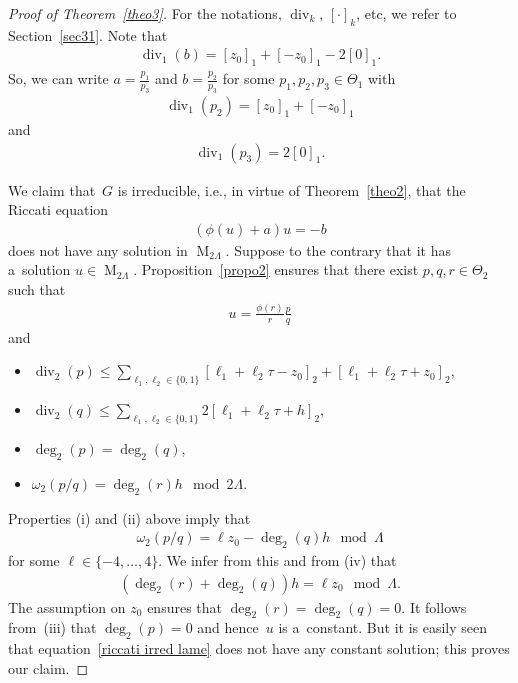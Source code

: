 \documentclass[10pt,a4paper]{amsart}
\numberwithin{equation}{section}
\newcommand{\divi}[1]{\operatorname{div}_{#1}}
\newcommand{\weight}[1]{\omega_{#1}}
\newcommand{\degr}[1]{\deg_{#1}}
\newcommand{\prodtheta}[1]{\Theta_{#1}}
\begin{document}
\begin{proof}[Proof of Theorem~\ref{theo3}] For the notations, $\divi{k}$, $[\cdot]_k$, etc, we refer to Section~\ref{sec31}.
Note that
\begin{gather*}
\divi{1} (b)=[z_{0}]_{1}+[-z_{0}]_{1}-2[0]_{1}.
\end{gather*}
So, we can write $a=\frac{p_{1}}{p_{3}}$ and $b=\frac{p_{2}}{p_{3}}$ for some $p_{1},p_{2},p_{3}\in \prodtheta{1}$ with
\begin{gather*}
\divi{1} (p_{2})=[z_{0}]_{1}+[-z_{0}]_{1}
\end{gather*}
and
\begin{gather*}
\divi{1} (p_{3})=2[0]_{1}.
\end{gather*}

We claim that~$G$ is irreducible, i.e., in virtue of Theorem~\ref{theo2}, that the Riccati equation
\begin{gather}
\label{riccati irred lame}
(\phi(u)+a)u=-b
\end{gather}
does not have any solution in $\operatorname{M}_{2\Lambda}$.
Suppose to the contrary that it has a~solution $u \in \operatorname{M}_{2\Lambda}$.
Proposition~\ref{propo2} ensures that there exist $p,q, r\in \prodtheta{2}$ such that
\begin{gather*}
u= \frac{\phi(r)}{r}\frac{p}{q}
\end{gather*}
and
\begin{itemize}
\itemsep=0pt
\item[(i)] $\divi{2} (p) \leq \sum\limits_{\ell_{1},\ell_{2} \in
\{0,1\}}[\ell_{1}+\ell_{2}\tau-z_{0}]_{2}+[\ell_{1}+\ell_{2}\tau+z_{0}]_{2}$,
\item[(ii)] $\divi{2} (q) \leq \sum\limits_{\ell_{1},\ell_{2} \in \{0,1\}}2[\ell_{1}+\ell_{2}\tau+h]_{2}$,
\item[(iii)] $\degr{2} (p)=\degr{2} (q)$,
\item[(iv)] $\weight{2} (p/q)=\degr{2} (r) h \mod 2\Lambda$.
\end{itemize}
Properties (i) and (ii) above imply that
\begin{gather*}
\weight{2} \left(p/q\right) = \ell z_{0}-\degr{2} (q)h \mod \Lambda
\end{gather*}
for some $\ell \in \{-4,\dots,4\}$.
We infer from this and from (iv) that
\begin{gather*}
(\degr{2} (r) + \degr{2} (q))h = \ell z_{0} \mod \Lambda.
\end{gather*}
The assumption on $z_{0}$ ensures that $\degr{2} (r) = \degr{2} (q)=0$.
It follows from~(iii) that $ \degr{2} (p)=0$ and hence~$u$ is a~constant.
But it is easily seen that equation~\eqref{riccati irred lame} does not have any constant solution; this proves our
claim.


\end{proof}
\end{document}
